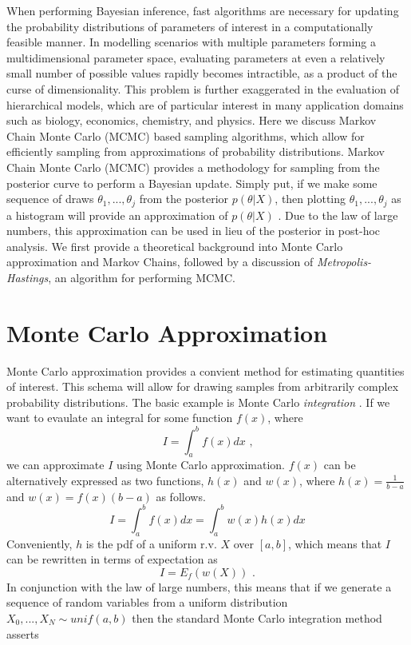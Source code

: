\documentclass[
  12pt,
]{book}
\theoremstyle{definition}
\theoremstyle{definition}
\theoremstyle{definition}
\theoremstyle{remark}
\begin{document}
When performing Bayesian inference, fast algorithms are necessary for updating the probability distributions of parameters of interest in a computationally feasible manner.
In modelling scenarios with multiple parameters forming a multidimensional parameter space, evaluating parameters at even a relatively small number of possible values rapidly becomes intractible, as a product of the curse of dimensionality.
This problem is further exaggerated in the evaluation of hierarchical models, which are of particular interest in many application domains such as biology, economics, chemistry, and physics.
Here we discuss Markov Chain Monte Carlo (MCMC) based sampling algorithms, which allow for efficiently sampling from approximations of probability distributions.
Markov Chain Monte Carlo (MCMC) provides a methodology for sampling from the posterior curve to perform a Bayesian update.
Simply put, if we make some sequence of draws \(\theta_1,...,\theta_j\) from the posterior \(p(\theta|X)\), then plotting \(\theta_1,...,\theta_j\) as a histogram will provide an approximation of \(p(\theta|X)\) \citep[  11.4]{Wasserman2004}.
Due to the law of large numbers, this approximation can be used in lieu of the posterior in post-hoc analysis.
We first provide a theoretical background into Monte Carlo approximation and Markov Chains, followed by a discussion of \emph{Metropolis-Hastings}, an algorithm for performing MCMC.

\hypertarget{monte-carlo-approximation}{%
\section{Monte Carlo Approximation}\label{monte-carlo-approximation}}

Monte Carlo approximation provides a convient method for estimating quantities of interest.
This schema will allow for drawing samples from arbitrarily complex probability distributions.
The basic example is Monte Carlo \emph{integration} \citep[  24.2]{Wasserman2004}.
If we want to evaulate an integral for some function \(f(x)\), where
\[I=\int_{a}^{b}f(x)dx \textrm{ ,}\]
we can approximate \(I\) using Monte Carlo approximation. \(f(x)\) can be alternatively expressed as two functions, \(h(x)\) and \(w(x)\), where \(h(x)=\frac{1}{b-a}\) and \(w(x)=f(x)(b-a)\) as follows.
\[I=\int_{a}^{b}f(x)dx=\int_{a}^{b}w(x)h(x)dx\]
Conveniently, \(h\) is the pdf of a uniform r.v. \(X\) over \([a,b]\), which means that \(I\) can be rewritten in terms of expectation as
\[I=E_{f}(w(X)) \textrm{ .}\]
In conjunction with the law of large numbers, this means that if we generate a sequence of random variables from a uniform distribution \(X_{0},...,X_{N}\sim unif(a,b)\) then the standard Monte Carlo integration method asserts
\end{document}
